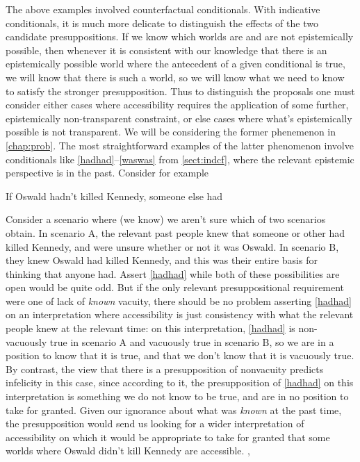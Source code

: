 \documentclass[If.tex]{subfiles}
\begin{document}
The above examples involved counterfactual conditionals. With indicative conditionals, it is much more delicate to distinguish the effects of the two candidate presuppositions. If we know which worlds are and are not epistemically possible, then whenever it is consistent with our knowledge that there is an epistemically possible world where the antecedent of a given conditional is true, we will know that there is such a world, so we will know what we need to know to satisfy the stronger presupposition. Thus to distinguish the proposals one must consider either cases where accessibility requires the application of some further, epistemically non-transparent constraint, or else cases where what's epistemically possible is not transparent. We will be considering the former phenemenon in \autoref{chap:prob}.  The most straightforward examples of the latter phenomenon involve conditionals like \ref{hadhad}--\ref{waswas} from \autoref{sect:indcf}, where the relevant epistemic perspective is in the past. Consider for example
\begin{prop}
	\sitem[\ref{hadhad}] 
	If Oswald hadn't killed Kennedy, someone else had 
\end{prop}
Consider a scenario where (we know) we aren't sure which of two scenarios obtain. In scenario A, the relevant past people knew that someone or other had killed Kennedy, and were unsure whether or not it was Oswald. In scenario B, they knew Oswald had killed Kennedy, and this was their entire basis for thinking that anyone had. Assert \ref{hadhad} while both of these possibilities are open would be quite odd.  But if the only relevant presuppositional requirement were one of lack of \emph{known} vacuity, there should be no problem asserting \ref{hadhad} on an interpretation where accessibility is just consistency with what the relevant people knew at the relevant time: on this interpretation, \ref{hadhad} is non-vacuously true in scenario A and vacuously true in scenario B, so we are in a position to know that it is true, and that we don't know that it is vacuously true.  By contrast, the view that there is a presupposition of nonvacuity predicts infelicity in this case, since according to it, the presupposition of \ref{hadhad} on this interpretation is something we do not know to be true, and are in no position to take for granted.  Given our ignorance about what was \emph{known} at the past time, the presupposition would send us looking for a wider interpretation of accessibility on which it would be appropriate to take for granted that some worlds where Oswald didn't kill Kennedy are accessible.%
,%
\end{document}
